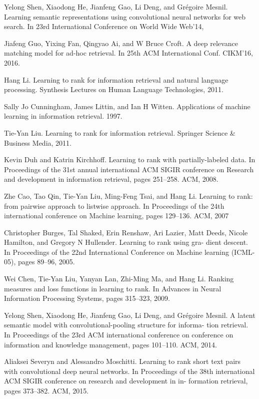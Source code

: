 \documentclass{llncs}
\begin{document}
\begin{thebibliography}{}
 Yelong Shen, Xiaodong He, Jianfeng Gao, Li Deng, and Grégoire Mesnil. Learning semantic representations using convolutional neural networks for web search. In 23rd International Conference on World Wide Web’14,

 Jiafeng Guo, Yixing Fan, Qingyao Ai, and W Bruce Croft. A deep relevance matching model for ad-hoc retrieval. In 25th ACM International Conf. CIKM’16, 2016.

 Hang Li. Learning to rank for information retrieval and natural language processing. Synthesis Lectures on Human Language Technologies, 2011.

 Sally Jo Cunningham, James Littin, and Ian H Witten. Applications of machine learning in information retrieval. 1997.

 Tie-Yan Liu. Learning to rank for information retrieval. Springer Science \& Business Media, 2011.

 Kevin Duh and Katrin Kirchhoff. Learning to rank with partially-labeled data. In Proceedings of the 31st annual international ACM SIGIR conference on Research and development in information retrieval, pages 251–258. ACM, 2008.

 Zhe Cao, Tao Qin, Tie-Yan Liu, Ming-Feng Tsai, and Hang Li. Learning to rank: from pairwise approach to listwise approach. In Proceedings of the 24th international conference on Machine learning, pages 129–136. ACM, 2007

 Christopher Burges, Tal Shaked, Erin Renshaw, Ari Lazier, Matt Deeds, Nicole Hamilton, and Gregory N Hullender. Learning to rank using gra- dient descent. In Proceedings of the 22nd International Conference on Machine learning (ICML-05), pages 89–96, 2005.

 Wei Chen, Tie-Yan Liu, Yanyan Lan, Zhi-Ming Ma, and Hang Li. Ranking measures and loss functions in learning to rank. In Advances in Neural Information Processing Systems, pages 315–323, 2009.

 Yelong Shen, Xiaodong He, Jianfeng Gao, Li Deng, and Grégoire Mesnil. A latent semantic model with convolutional-pooling structure for informa- tion retrieval. In Proceedings of the 23rd ACM international conference on conference on information and knowledge management, pages 101–110. ACM, 2014.

 Aliaksei Severyn and Alessandro Moschitti. Learning to rank short text pairs with convolutional deep neural networks. In Proceedings of the 38th international ACM SIGIR conference on research and development in in- formation retrieval, pages 373–382. ACM, 2015.


\end{thebibliography}
\end{document}
